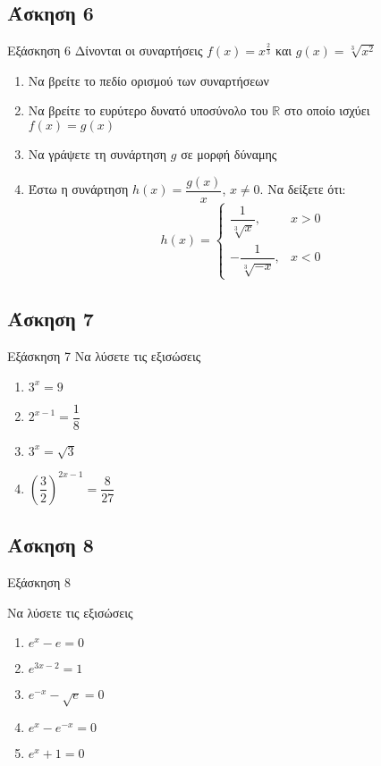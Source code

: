 \documentclass[greek]{beamer}
\begin{document}
\subsection{Άσκηση 6}
\begin{frame}[label=Άσκηση6,t]{Εξάσκηση 6}
 Δίνονται οι συναρτήσεις $f(x)=x^{\frac{2}{3}}$ και $g(x)=\sqrt[3]{x^2}$
 \begin{enumerate}
  \item<1-> Να βρείτε το πεδίο ορισμού των συναρτήσεων
  \item<2-> Να βρείτε το ευρύτερο δυνατό υποσύνολο του $\mathbb{R}$ στο οποίο ισχύει $f(x)=g(x)$
  \item<3-> Να γράψετε τη συνάρτηση $g$ σε μορφή δύναμης
  \item<4-> Έστω η συνάρτηση $h(x)=\dfrac{g(x)}{x}$, $x\ne 0$. Να δείξετε ότι:
   $$h(x)=\begin{cases}
     \dfrac{1}{\sqrt[3]{x}},   & x>0 \\
     -\dfrac{1}{\sqrt[3]{-x}}, & x<0
    \end{cases}$$
 \end{enumerate}

\end{frame}

\subsection{Άσκηση 7}
\begin{frame}[label=Άσκηση7,t]{Εξάσκηση 7}
 Να λύσετε τις εξισώσεις
 \begin{enumerate}
  \item<1-> $3^x=9$
  \item<2-> $2^{x-1}=\dfrac{1}{8}$
  \item<3-> $3^x=\sqrt{3}$
  \item<4-> $\left( \dfrac{3}{2} \right)^{2x-1}=\dfrac{8}{27}$
 \end{enumerate}

\end{frame}

\subsection{Άσκηση 8}
\begin{frame}[label=Άσκηση8,t]{Εξάσκηση 8}

 Να λύσετε τις εξισώσεις
 \begin{enumerate}
  \item<1-> $e^x-e=0$
  \item<2-> $e^{3x-2}=1$
  \item<3-> $e^{-x}-\sqrt{e}=0$
  \item<4-> $e^x-e^{-x}=0$
  \item<5-> $e^x+1=0$
 \end{enumerate}

\end{frame}
\end{document}
